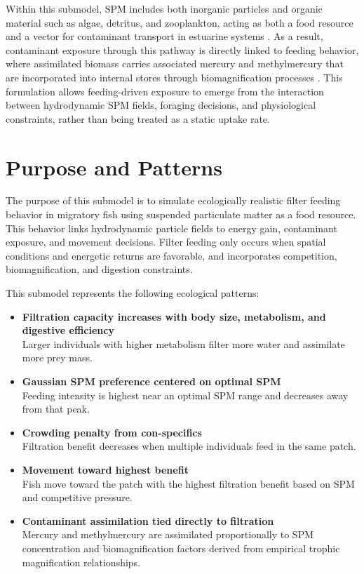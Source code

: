 \documentclass[
]{book}
\begin{document}
Within this submodel, SPM includes both inorganic particles and organic material such as algae, detritus, and zooplankton, acting as both a food resource and a vector for contaminant transport in estuarine systems \citep{kjelland_integrated_2015, kjelland_review_2015}. As a result, contaminant exposure through this pathway is directly linked to feeding behavior, where assimilated biomass carries associated mercury and methylmercury that are incorporated into internal stores through biomagnification processes \citep{lavoie_biomagnification_2013}. This formulation allows feeding-driven exposure to emerge from the interaction between hydrodynamic SPM fields, foraging decisions, and physiological constraints, rather than being treated as a static uptake rate.

\section{Purpose and Patterns}\label{purpose-and-patterns}

The purpose of this submodel is to simulate ecologically realistic filter feeding behavior in migratory fish using suspended particulate matter as a food resource. This behavior links hydrodynamic particle fields to energy gain, contaminant exposure, and movement decisions. Filter feeding only occurs when spatial conditions and energetic returns are favorable, and incorporates competition, biomagnification, and digestion constraints.

This submodel represents the following ecological patterns:

\begin{itemize}
\item
  \textbf{Filtration capacity increases with body size, metabolism, and digestive efficiency}\\
  Larger individuals with higher metabolism filter more water and assimilate more prey mass.
\item
  \textbf{Gaussian SPM preference centered on optimal SPM}\\
  Feeding intensity is highest near an optimal SPM range and decreases away from that peak.
\item
  \textbf{Crowding penalty from con-specifics}\\
  Filtration benefit decreases when multiple individuals feed in the same patch.
\item
  \textbf{Movement toward highest benefit}\\
  Fish move toward the patch with the highest filtration benefit based on SPM and competitive pressure.
\item
  \textbf{Contaminant assimilation tied directly to filtration}\\
  Mercury and methylmercury are assimilated proportionally to SPM concentration and biomagnification factors derived from empirical trophic magnification relationships.
\end{itemize}
\end{document}
